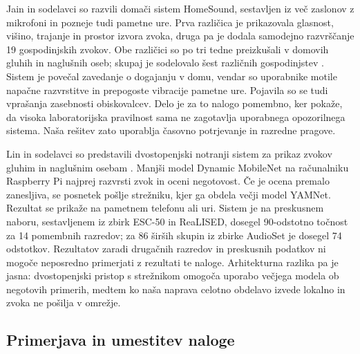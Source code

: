 Jain in sodelavci so razvili domači sistem HomeSound, sestavljen iz več
zaslonov z mikrofoni in pozneje tudi pametne ure. Prva različica je prikazovala
glasnost, višino, trajanje in prostor izvora zvoka, druga pa je dodala samodejno
razvrščanje 19 gospodinjskih zvokov. Obe različici so po tri tedne preizkušali
v domovih gluhih in naglušnih oseb; skupaj je sodelovalo šest različnih
gospodinjstev \cite{jain2020homesound}. Sistem je povečal zavedanje o dogajanju
v domu, vendar so uporabnike motile napačne razvrstitve in prepogoste vibracije
pametne ure. Pojavila so se tudi vprašanja zasebnosti obiskovalcev. Delo je za
to nalogo pomembno, ker pokaže, da visoka laboratorijska pravilnost sama ne
zagotavlja uporabnega opozorilnega sistema. Naša rešitev zato uporablja
časovno potrjevanje in razredne pragove.

Lin in sodelavci so predstavili dvostopenjski notranji sistem za prikaz zvokov
gluhim in naglušnim osebam \cite{lin2026indoor}. Manjši model Dynamic
MobileNet na računalniku Raspberry Pi najprej razvrsti zvok in oceni negotovost.
Če je ocena premalo zanesljiva, se posnetek pošlje strežniku, kjer ga obdela
večji model YAMNet. Rezultat se prikaže na pametnem telefonu ali uri. Sistem je
na preskusnem naboru, sestavljenem iz zbirk ESC-50 in ReaLISED, dosegel
90-odstotno točnost za 14 pomembnih razredov; za 86 širših skupin iz zbirke
AudioSet je dosegel 74 odstotkov. Rezultatov zaradi drugačnih razredov in
preskusnih podatkov ni mogoče neposredno primerjati z rezultati te naloge.
Arhitekturna razlika pa je jasna: dvostopenjski pristop s strežnikom omogoča
uporabo večjega modela ob negotovih primerih, medtem ko naša naprava celotno
obdelavo izvede lokalno in zvoka ne pošilja v omrežje.

\subsection{Primerjava in umestitev naloge}

